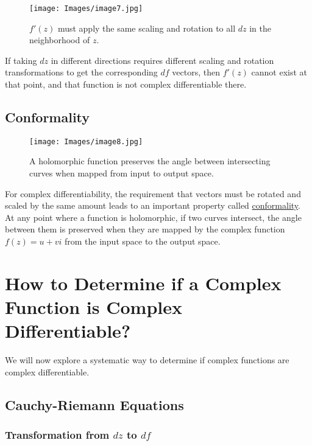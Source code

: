 \documentclass[a4paper,10.5pt]{article}
\begin{document}
\begin{figure}[H]
    \centering
    \texttt{[image: Images/image7.jpg]}
    \caption{\( f'(z) \) must apply the same scaling and rotation to all \( dz \) in the neighborhood of \( z \).}
    \label{fig:galaxy}
\end{figure}

If taking $dz$ in different directions requires different scaling and rotation transformations to get the corresponding $df$ vectors, then $f'(z)$ cannot exist at that point, and that function is not complex differentiable there.

\subsection{Conformality}

\begin{figure}[H]
    \centering
    \texttt{[image: Images/image8.jpg]}
    \caption{A holomorphic function preserves the angle between intersecting curves when mapped from input to output space.}
    \label{fig:galaxy}
\end{figure}


For complex differentiability, the requirement that vectors must be rotated and scaled by the same amount leads to an important property called \href{https://mathworld.wolfram.com/ConformalMapping.html}{conformality}. At any point where a function is holomorphic, if two curves intersect, the angle between them is preserved when they are mapped by the complex function $f(z) = u+vi$ from the input space to the output space.

\section{How to Determine if a Complex Function is Complex Differentiable?}

We will now explore a systematic way to determine if complex functions are complex differentiable.

\subsection{Cauchy-Riemann Equations}

\subsubsection{Transformation from $dz$ to $df$}
\end{document}
